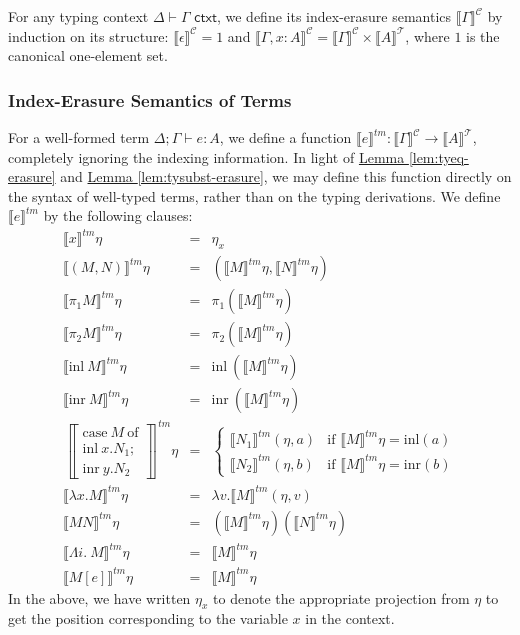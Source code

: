 \documentclass[natbib,preprint]{sigplanconf}
\newcommand{\isCtxt}{\textsf{ ctxt}}
\newcommand{\tySem}[1]{\llbracket #1 \rrbracket^{\mathcal{T}}}
\newcommand{\ctxtSem}[1]{\llbracket #1 \rrbracket^{\mathcal{C}}}
\newcommand{\tmSem}[1]{\llbracket #1 \rrbracket^{\mathit{tm}}}
\newcommand{\lemref}[1]{\hyperref[#1]{Lemma \ref*{#1}}}
\begin{document}
For any typing context $\Delta \vdash \Gamma \isCtxt$, we define its
index-erasure semantics $\ctxtSem{\Gamma}$ by induction on its
structure: $\ctxtSem{\epsilon} = 1$ and $\ctxtSem{\Gamma, x : A} =
\ctxtSem{\Gamma} \times \tySem{A}$, where $1$ is the canonical
one-element set.

\subsubsection{Index-Erasure Semantics of Terms}

For a well-formed term $\Delta; \Gamma \vdash e : A$, we define a
function $\tmSem{e} : \ctxtSem{\Gamma} \to \tySem{A}$, completely
ignoring the indexing information. In light of
\lemref{lem:tyeq-erasure} and \lemref{lem:tysubst-erasure}, we may
define this function directly on the syntax of well-typed terms,
rather than on the typing derivations. We define $\tmSem{e}$ by the
following clauses:
\begin{eqnarray*}
  \tmSem{x}\eta & = & \eta_x \\
  \tmSem{(M,N)}\eta & = & (\tmSem{M}\eta, \tmSem{N}\eta) \\
  \tmSem{\pi_1M}\eta & = & \pi_1(\tmSem{M}\eta) \\
  \tmSem{\pi_2M}\eta & = & \pi_2(\tmSem{M}\eta) \\
  \tmSem{\mathrm{inl}\ M}\eta & = & \mathrm{inl}\ (\tmSem{M}\eta) \\
  \tmSem{\mathrm{inr}\ M}\eta & = & \mathrm{inr}\ (\tmSem{M}\eta) \\
  \left\llbracket
    \begin{array}{l}
      \textrm{case}\ M\ \textrm{of}\\
      \textrm{inl}\ x.N_1;\\
      \textrm{inr}\ y.N_2
    \end{array}\right\rrbracket^{\mathit{tm}}\eta & = &
  \left\{
    \begin{array}{ll}
      \tmSem{N_1}(\eta,a) & \textrm{if }\tmSem{M}\eta = \mathrm{inl}(a) \\
      \tmSem{N_2}(\eta,b) & \textrm{if }\tmSem{M}\eta = \mathrm{inr}(b)
    \end{array}
  \right. \\
  \tmSem{\lambda x. M}\eta & = & \lambda v. \tmSem{M}(\eta, v) \\
  \tmSem{M N}\eta & = & (\tmSem{M}\eta) (\tmSem{N}\eta) \\
  \tmSem{\Lambda i.\ M}\eta & = & \tmSem{M}\eta \\
  \tmSem{M[e]}\eta & = & \tmSem{M}\eta
\end{eqnarray*}
In the above, we have written $\eta_x$ to denote the appropriate
projection from $\eta$ to get the position corresponding to the
variable $x$ in the context.
\end{document}
